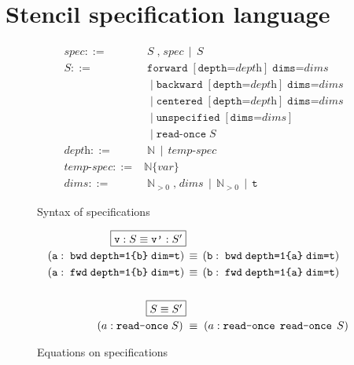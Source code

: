 \documentclass[10pt]{sigplanconf}
\theoremstyle{definition}
\begin{document}
\section{Stencil specification language}
\label{sec:lang}

\begin{figure}
\begin{align*}
spec ::= & \; S  \; \texttt{,} \; spec \, \mid \, S \\[0.5em]
%
S ::= &  \; \texttt{forward} \; [\texttt{depth=}\textit{depth}] \; \texttt{dims=}\textit{dims} \\
& \; \mid \texttt{backward} \; [\texttt{depth=}\textit{depth}] \; \texttt{dims=}\textit{dims} \\
& \; \mid \texttt{centered} \; [\texttt{depth=}\textit{depth}] \; \texttt{dims=}\textit{dims} \\
& \; \mid \texttt{unspecified} \; [\texttt{dims=}\textit{dims}] \\
& \; \mid \texttt{read-once} \; S \\[0.5em]
\textit{depth} ::= & \; \mathbb{N} \, \mid \, \textit{temp-spec} \\ 
\textit{temp-spec} ::= & \mathbb{N}\{var\} \\
\textit{dims}  ::= & \;\mathbb{N}_{>0} \; \texttt{,} \; \textit{dims} \,
                      \mid \, \mathbb{N}_{>0} \, \mid \, 
                     \texttt{t}
\end{align*}
\caption{Syntax of specifications}
\end{figure}

\begin{figure}
\begin{align*}
\framebox{$\texttt{v} : S \equiv \texttt{v'} : S'$} \\
(\texttt{a} : \; \texttt{bwd} \; \texttt{depth=1\{b\}} \;
  \texttt{dim=t})
\, & \equiv \,
(\texttt{b} : \; \texttt{bwd} \; \texttt{depth=1\{a\}} \;
  \texttt{dim=t})
\\ 
(\texttt{a} : \; \texttt{fwd} \; \texttt{depth=1\{b\}} \;
  \texttt{dim=t})
\, & \equiv \,
(\texttt{b} : \; \texttt{fwd} \; \texttt{depth=1\{a\}} \;
  \texttt{dim=t})
\\ \\
\framebox{$S \equiv S'$} \\
(a : \texttt{read-once} \; S) \; & \equiv \; (a : \texttt{read-once} \;\,
  \texttt{read-once} \; \, S)
\end{align*}
\caption{Equations on specifications}
\end{figure}
\end{document}

